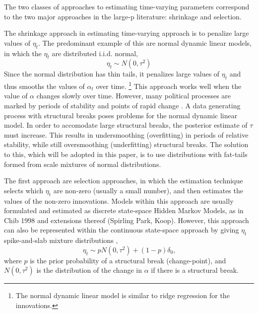 \documentclass{article}
\begin{document}
The two classes of approaches to estimating time-varying parameters correspond to the two major approaches in the large-p literature: shrinkage and selection.

The shrinkage approach in estimating time-varying approach is to penalize large values of $\eta_{t}$. 
The predominant example of this are normal dynamic linear models, in which the $\eta_{t}$ are distributed i.i.d. normal,
\begin{equation}
  \label{eq:4}
  \eta_{t} \sim N(0, \tau^{2})
\end{equation}
Since the normal distribution has thin tails, it penalizes large values of $\eta_{t}$ and thus smooths the values of $\alpha_{t}$ over time.
\footnote{The normal dynamic linear model is similar to ridge regression for the innovations.}
This approach works well when the value of $\alpha$ changes slowly over time.
However, many political processes are marked by periods of stability and points of rapid change \parencite{RatkovicEng2010}.
A data generating process with structural breaks poses problems for the normal dynamic linear model.
In order to accomodate large structural breaks, the posterior estimate of $\tau$ must increase. 
This results in undersmoothing (overfitting) in periods of relative stability, while still oversmoothing (underfitting) structural breaks.
The solution to this, which will be adopted in this paper, is to use distributions with fat-tails formed from scale mixtures of normal distributions.

The first approach are selection approaches, in which the estimation technique selects which $\eta_{t}$ are non-zero (usually a small number), and then estimates the values of the non-zero innovations.
Models within this approach are usually formulated and estimated as discrete state-space Hidden Markov Models, as in Chib 1998 and extensions thereof (Spirling Park, Koop).
However, this approach can also be represented within the continuous state-space approach by giving $\eta_{t}$ spike-and-slab mixture distributions \parencite{GiordaniKohn2008},
\begin{equation}
  \label{eq:1}
  \eta_{t} \sim p N(0, \tau^{2}) + (1 - p) \delta_{0} \text{,}
\end{equation}
where $p$ is the prior probability of a structural break (change-point), and $N(0, \tau^{2})$ is the distribution of the change in $\alpha$ if there is a structural break.
\end{document}
